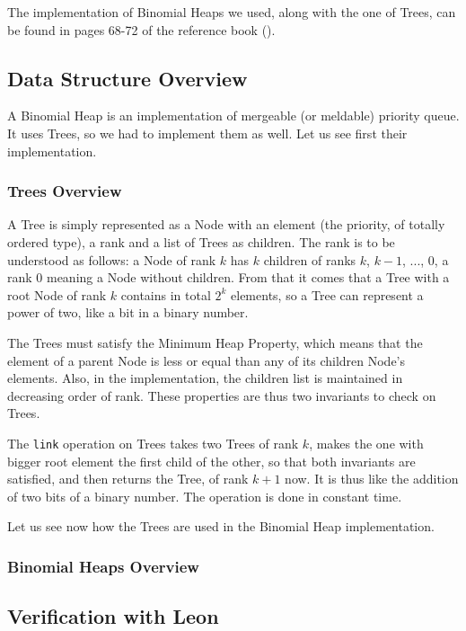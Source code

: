 The implementation of Binomial Heaps we used, 
along with the one of Trees, 
can be found in pages 68-72 of the reference book (\cite{Okasaki}).

\subsection{Data Structure Overview}
A Binomial Heap is an implementation of mergeable (or meldable) priority queue.
It uses Trees, so we had to implement them as well.
Let us see first their implementation.

\subsubsection{Trees Overview}
A Tree is simply represented as a Node with an element 
(the priority, of totally ordered type), a rank and a list of Trees as children.
The rank is to be understood as follows:
a Node of rank $k$ has $k$ children of ranks $k$, $k-1$, ..., $0$,
a rank $0$ meaning a Node without children.
From that it comes that a Tree with a root Node of rank $k$ 
contains in total $2^k$ elements,
so a Tree can represent a power of two, 
like a bit in a binary number.

The Trees must satisfy the Minimum Heap Property, 
which means that the element of a parent Node 
is less or equal than any of its children Node's elements.
Also, in the implementation, the children list is maintained in decreasing order of rank.
These properties are thus two invariants to check on Trees.

The \verb|link| operation on Trees takes two Trees of rank $k$, 
makes the one with bigger root element the first child of the other,
so that both invariants are satisfied,
and then returns the Tree, of rank $k+1$ now.
It is thus like the addition of two bits of a binary number.
The operation is done in constant time.

Let us see now how the Trees are used in the Binomial Heap implementation.

\subsubsection{Binomial Heaps Overview}



\subsection{Verification with Leon}
